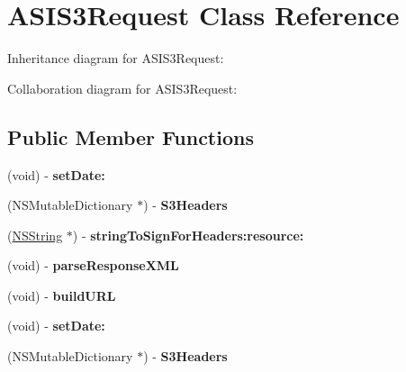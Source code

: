 \hypertarget{interface_a_s_i_s3_request}{
\section{\-A\-S\-I\-S3\-Request \-Class \-Reference}
\label{interface_a_s_i_s3_request}
}


\-Inheritance diagram for \-A\-S\-I\-S3\-Request\-:


\-Collaboration diagram for \-A\-S\-I\-S3\-Request\-:
\subsection*{\-Public \-Member \-Functions}
\begin{DoxyCompactItemize}
\item 
\hypertarget{interface_a_s_i_s3_request_a3eb32c464e0663e896f97338e45fcbcc}{
(void) -\/ {\bfseries set\-Date\-:}}
\label{interface_a_s_i_s3_request_a3eb32c464e0663e896f97338e45fcbcc}

\item 
\hypertarget{interface_a_s_i_s3_request_ae9241f3e6890675b37ebcc612a4112b3}{
(\-N\-S\-Mutable\-Dictionary $\ast$) -\/ {\bfseries \-S3\-Headers}}
\label{interface_a_s_i_s3_request_ae9241f3e6890675b37ebcc612a4112b3}

\item 
\hypertarget{interface_a_s_i_s3_request_a6186d54d09b61de7f1929707a983a95b}{
(\hyperlink{class_n_s_string}{\-N\-S\-String} $\ast$) -\/ {\bfseries string\-To\-Sign\-For\-Headers\-:resource\-:}}
\label{interface_a_s_i_s3_request_a6186d54d09b61de7f1929707a983a95b}

\item 
\hypertarget{interface_a_s_i_s3_request_a537b485990a0b0b1cf22d122439b89e1}{
(void) -\/ {\bfseries parse\-Response\-X\-M\-L}}
\label{interface_a_s_i_s3_request_a537b485990a0b0b1cf22d122439b89e1}

\item 
\hypertarget{interface_a_s_i_s3_request_ace59aaf9a74564868fc1f426b363e5bb}{
(void) -\/ {\bfseries build\-U\-R\-L}}
\label{interface_a_s_i_s3_request_ace59aaf9a74564868fc1f426b363e5bb}

\item 
\hypertarget{interface_a_s_i_s3_request_a3eb32c464e0663e896f97338e45fcbcc}{
(void) -\/ {\bfseries set\-Date\-:}}
\label{interface_a_s_i_s3_request_a3eb32c464e0663e896f97338e45fcbcc}

\item 
\hypertarget{interface_a_s_i_s3_request_ae9241f3e6890675b37ebcc612a4112b3}{
(\-N\-S\-Mutable\-Dictionary $\ast$) -\/ {\bfseries \-S3\-Headers}}
\label{interface_a_s_i_s3_request_ae9241f3e6890675b37ebcc612a4112b3}


\end{DoxyCompactItemize}
